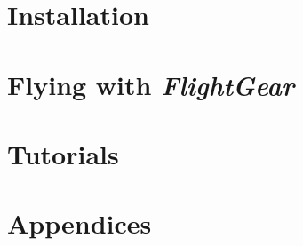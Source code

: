 \documentclass[11pt,a4paper]{book}
\newcommand{\FlightGear}{{\itshape\bfseries FlightGear}}
\begin{document}


\part{Installation}


\part{Flying with \FlightGear{}}



\part{Tutorials}


\part{Appendices}
\begin{appendix}




\end{appendix}


\end{document}
